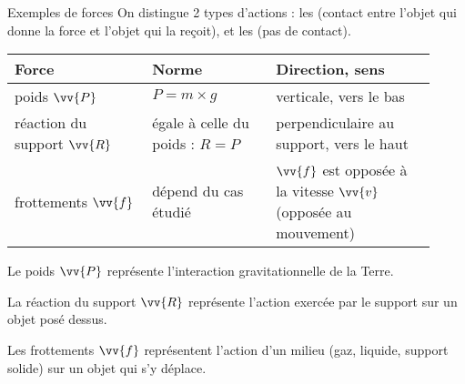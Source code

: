 \begin{doc}{Exemples de forces}
  \label{doc:exemples_forces}
  On distingue 2 types d'actions : les  (contact entre l’objet qui donne la force et l’objet qui la reçoit), et les  (pas de contact).
  \smallskip
  
  \begin{tabularx}{\linewidth}{| m{0.3\linewidth} | m{0.275\linewidth} | m{0.35\linewidth} |}
    \hline
    \rowcolor{gray!20}
    \centering Force &
    \centering Norme &
    Direction, sens 
    \\ \hline
    \centering poids $\vv{P}$ &
    \centering $P = m \times g$ &
    verticale, vers le bas
    \\ \hline
    \centering réaction du support $\vv{R}$ &
    \centering égale à celle du poids : \newline $R = P$ &
    perpendiculaire au support, vers le haut
    \\ \hline
    \centering frottements $\vv{f}$ &
    dépend du cas étudié &
    $\vv{f}$ est opposée à la vitesse $\vv{v}$ (opposée au mouvement)
    \\ \hline
  \end{tabularx}
  \smallskip
  
  \begin{listePoints}
    \item Le poids $\vv{P}$ représente l'interaction gravitationnelle de la Terre.
    \item La réaction du support $\vv{R}$ représente l'action exercée par le support sur un objet posé dessus.
    \item Les frottements $\vv{f}$ représentent l'action d'un milieu (gaz, liquide, support solide) sur un objet qui s'y déplace.
  \end{listePoints}
\end{doc}

